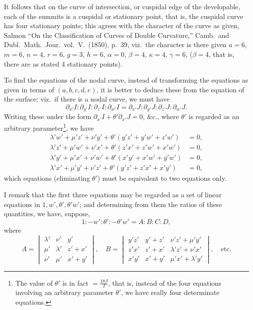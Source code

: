 \documentclass[11pt,a4paper]{article}
\theoremstyle{definition}
\begin{document}
\newpage

It follows that on the curve of intersection, or cuspidal edge of the developable, each of the summits is a cuspidal or stationary point, that is, the cuspidal curve has four stationary points; this agrees with the character of the curve as given, Salmon ``On the Classification of Curves of Double Curvature,'' Camb.\ and Dubl.\ Math.\ Jour.\ vol.\ V.\ (1850), p.~39, viz.\ the character is there given $a = 6$, $m = 6$, $n = 4$, $r = 6$, $g = 3$, $h = 6$, $\alpha = 0$, $\beta = 4$, $\kappa = 4$, $\gamma = 6$, ($\beta = 4$, that is, there are as stated 4 stationary points).

To find the equations of the nodal curve, instead of transforming the equations as given in terms of $(a,b,c,d,e)$, it is better to deduce these from the equation of the surface; viz.\ if there is a nodal curve, we must have
\[
\partial_{x'}I : \partial_{y'}I : \partial_{z'}I : \partial_{w'}I = \partial_{x'}J : \partial_{y'}J : \partial_{z'}J : \partial_{w'}J.
\]
Writing these under the form $\partial_{x'}I + \theta'\partial_{x'}J = 0$, \&c., where $\theta'$ is regarded as an arbitrary parameter\footnote{The value of $\theta'$ is in fact $= \frac{18J}{I}$, that is, instead of the four equations involving an arbitrary parameter $\theta'$, we have really four determinate equations.}, we have
\begin{align*}
\lambda'w' + \mu'z' + \nu'y' + \theta'(y'z' + y'w' + z'w') &= 0,\\
\lambda'z' + \mu'w' + \nu'x' + \theta'(z'x' + z'w' + x'w') &= 0,\\
\lambda'y' + \mu'x' + \nu'w' + \theta'(x'y' + x'w' + y'w') &= 0,\\
\lambda'x' + \mu'y' + \nu'z' + \theta'(y'z' + z'x' + x'y') &= 0,
\end{align*}
which equations (eliminating $\theta'$) must be equivalent to two equations only.

I remark that the first three equations may be regarded as a set of linear equations in $1, w', \theta', \theta'w'$; and determining from them the ratios of these quantities, we have, suppose,
\[
1 : -w' : \theta' : -\theta'w' = A : B : C : D,
\]
where
\[
A = \begin{vmatrix} \lambda' & \nu' & y' \\ \mu' & \lambda' & z'+x' \\ \nu' & \mu' & x'+y' \end{vmatrix},\quad
B = \begin{vmatrix} y'z' & y'+z' & \nu'z'+\mu'y' \\ z'x' & z'+x' & \lambda'z'+\nu'x' \\ x'y' & x'+y' & \mu'x'+\lambda'y' \end{vmatrix},\quad \text{etc.}
\]
\end{document}
